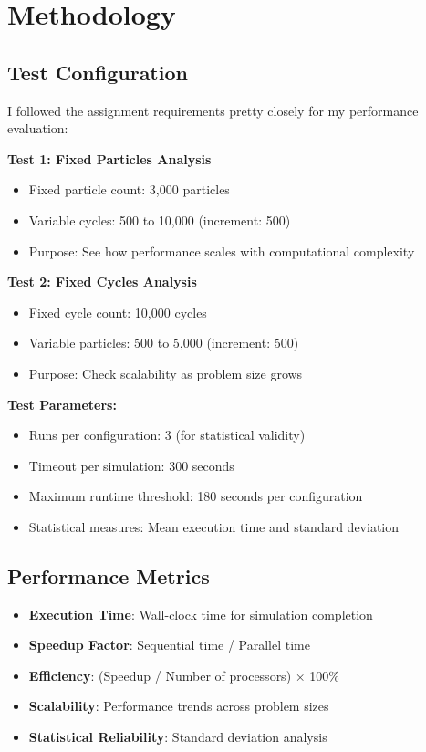 \documentclass[12pt,a4paper]{article}
\begin{document}
\section{Methodology}

\subsection{Test Configuration}
I followed the assignment requirements pretty closely for my performance evaluation:

\textbf{Test 1: Fixed Particles Analysis}
\begin{itemize}
    \item Fixed particle count: 3,000 particles
    \item Variable cycles: 500 to 10,000 (increment: 500)
    \item Purpose: See how performance scales with computational complexity
\end{itemize}

\textbf{Test 2: Fixed Cycles Analysis}
\begin{itemize}
    \item Fixed cycle count: 10,000 cycles
    \item Variable particles: 500 to 5,000 (increment: 500)
    \item Purpose: Check scalability as problem size grows
\end{itemize}

\textbf{Test Parameters:}
\begin{itemize}
    \item Runs per configuration: 3 (for statistical validity)
    \item Timeout per simulation: 300 seconds
    \item Maximum runtime threshold: 180 seconds per configuration
    \item Statistical measures: Mean execution time and standard deviation
\end{itemize}

\subsection{Performance Metrics}
\begin{itemize}
    \item \textbf{Execution Time}: Wall-clock time for simulation completion
    \item \textbf{Speedup Factor}: Sequential time / Parallel time
    \item \textbf{Efficiency}: (Speedup / Number of processors) × 100\%
    \item \textbf{Scalability}: Performance trends across problem sizes
    \item \textbf{Statistical Reliability}: Standard deviation analysis
\end{itemize}
\end{document}
